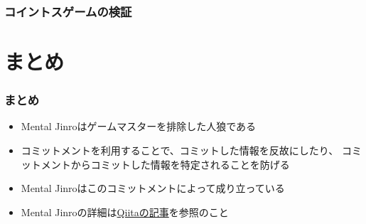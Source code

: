 \begin{frame}[fragile]
  \frametitle{コイントスゲームの検証}

  \begin{center}




  \end{center}
\end{frame}

\section{まとめ}
\begin{frame}[fragile]
  \frametitle{まとめ}

  \begin{itemize}
    \item<2-> Mental Jinroはゲームマスターを排除した人狼である
    \item<3-> コミットメントを利用することで、コミットした情報を反故にしたり、
      コミットメントからコミットした情報を特定されることを防げる
    \item<4-> Mental Jinroはこのコミットメントによって成り立っている
    \item<5-> Mental Jinroの詳細は\href{http://qiita.com/yyu/items/8c10fcdbc17084ac2674}{Qiitaの記事}を参照のこと
  \end{itemize}
\end{frame}

